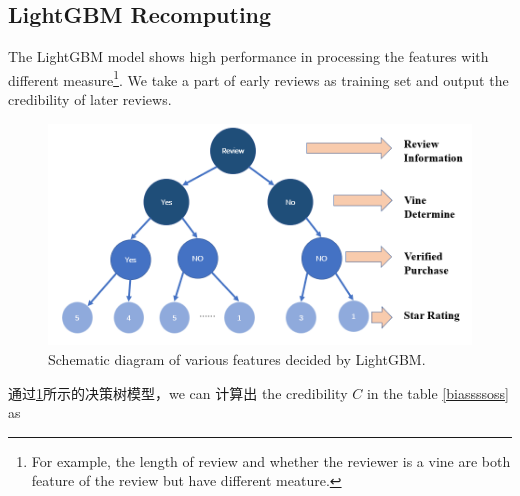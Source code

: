 \documentclass[12pt]{article}%
\begin{document}
\subsection{LightGBM Recomputing}
The LightGBM\cite{lgb,lgb2} model shows high performance in processing the features with different measure\footnote{\quad For example, the length of review and whether the reviewer is a vine are both feature of the review but have different meature.}. We take a part of early reviews as training set and output the credibility of later reviews.


\begin{figure}[H]
	\centering
	\includegraphics[width=\textwidth]{shu.png}%
	\caption{Schematic diagram of various features decided by LightGBM.}\label{llsaall}%
\end{figure}

通过\ref{llsaall}所示的决策树模型，we can 计算出 the credibility $C$ in the table \ref{biassssoss} as 
\end{document}
